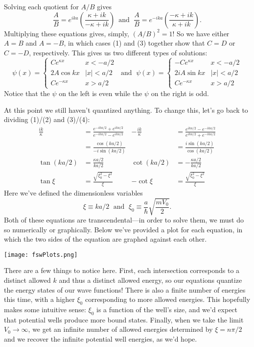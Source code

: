 \documentclass[../p052main.tex]{subfiles}
\begin{document}
Solving each quotient for $A/B$ gives
\[ \frac{A}{B} = e^{ika} \left( \frac{\kappa + ik}{-\kappa + ik} \right) \,\text{ and }\; \frac{A}{B} = e^{-ika} \left( \frac{-\kappa + ik}{\kappa + ik} \right). \]
Multiplying these equations gives, simply, $(A / B)^2 = 1$!
So we have either $A = B$ and $A = -B$, in which cases (1) and (3) together show that $C = D$ or $C = -D$, respectively.
This gives us two different types of solutions:
\[ \psi(x) = \begin{cases} Ce^{\kappa x} & x < -a/2 \\ 2A \cos kx & |x| < a/2 \\
Ce^{-\kappa x} & x > a/2 \end{cases} \;\text{ and }\; \psi(x) = \begin{cases} -Ce^{\kappa x} & x < -a/2 \\ 2iA \sin kx & |x| < a/2 \\ Ce^{-\kappa x} & x > a/2 \end{cases} \]
Notice that the $\psi$ on the left is even while the $\psi$ on the right is odd.

At this point we still haven't quantized anything.
To change this, let's go back to dividing (1)/(2) and (3)/(4):
\begin{align*}
    \frac{ik}{\kappa} &= \frac{e^{-ika / 2} + e^{ika / 2}}{e^{-ika / 2} - e^{ika / 2}} & -\frac{ik}{\kappa} &= \frac{e^{ika / 2} - e^{-ika / 2}}{e^{ika / 2} + e^{-ika / 2}} \\
    &= \frac{\cos (ka / 2)}{-i \sin (ka / 2)} & &= \frac{i \sin (ka / 2)}{\cos (ka / 2)} \\
    \tan (ka / 2) &= \frac{\kappa a / 2}{ka / 2} & \cot (ka / 2) &= -\frac{\kappa a / 2}{ka / 2} \\
    \tan \xi &= \frac{\sqrt{\xi_0^2 - \xi^2}}{\xi} & -\cot \xi &= \frac{\sqrt{\xi_0^2 - \xi^2}}{\xi}
\end{align*}
Here we've defined the dimensionless variables
\[ \xi \equiv ka / 2 \;\text{ and }\; \xi_0 \equiv \frac{a}{\hbar} \sqrt{\frac{mV_0}{2}}. \]
Both of these equations are transcendental---in order to solve them, we must do so numerically or graphically.
Below we've provided a plot for each equation, in which the two sides of the equation are graphed against each other.
\begin{center}
    \texttt{[image: fswPlots.png]}
\end{center}
There are a few things to notice here.
First, each intersection corresponds to a distinct allowed $k$ and thus a distinct allowed energy, so our equations quantize the energy states of our wave functions!
There is also a finite number of energies this time, with a higher $\xi_0$ corresponding to more allowed energies.
This hopefully makes some intuitive sense: $\xi_0$ is a function of the well's size, and we'd expect that potential wells produce more bound states.
Finally, when we take the limit $V_0 \to \infty$, we get an infinite number of allowed energies determined by $\xi = n\pi / 2$ and we recover the infinite potential well energies, as we'd hope.
\end{document}
